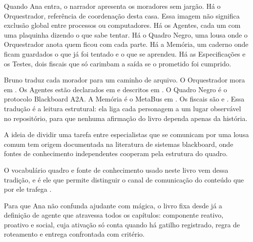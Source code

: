Quando Ana entra, o narrador apresenta os moradores sem jarg\~ao. H\'a o Orquestrador, refer\^encia de coordena\c{c}\~ao desta casa. Essa imagem n\~ao significa exclus\~ao global entre processos ou computadores. H\'a os Agentes, cada um com uma plaquinha dizendo o que sabe tentar. H\'a o Quadro Negro, uma lousa onde o Orquestrador anota quem ficou com cada parte. H\'a a Mem\'oria, um caderno onde ficam guardados o que j\'a foi tentado e o que se aprendeu. H\'a as Especifica\c{c}\~oes e os Testes, dois fiscais que s\'o carimbam a sa\'ida se o prometido foi cumprido.

Bruno traduz cada morador para um caminho de arquivo. O Orquestrador mora em . Os Agentes est\~ao declarados em  e descritos em . O Quadro Negro \'e o protocolo Blackboard A2A. A Mem\'oria \'e o MetaBus em . Os fiscais s\~ao  e . Essa tradu\c{c}\~ao \'e a leitura estrutural: ela liga cada personagem a um lugar observ\'avel no reposit\'orio, para que nenhuma afirma\c{c}\~ao do livro dependa apenas da hist\'oria.

A ideia de dividir uma tarefa entre especialistas que se comunicam por uma lousa comum tem origem documentada na literatura de sistemas blackboard, onde fontes de conhecimento independentes cooperam pela estrutura do quadro.

O vocabul\'ario quadro e fonte de conhecimento usado neste livro vem dessa tradi\c{c}\~ao, e \'e ele que permite distinguir o canal de comunica\c{c}\~ao do conte\'udo que por ele trafega .

Para que Ana n\~ao confunda ajudante com m\'agica, o livro fixa desde j\'a a defini\c{c}\~ao de agente que atravessa todos os cap\'itulos: componente reativo, proativo e social, cuja ativa\c{c}\~ao s\'o conta quando h\'a gatilho registrado, regra de roteamento e entrega confrontada com crit\'erio.

